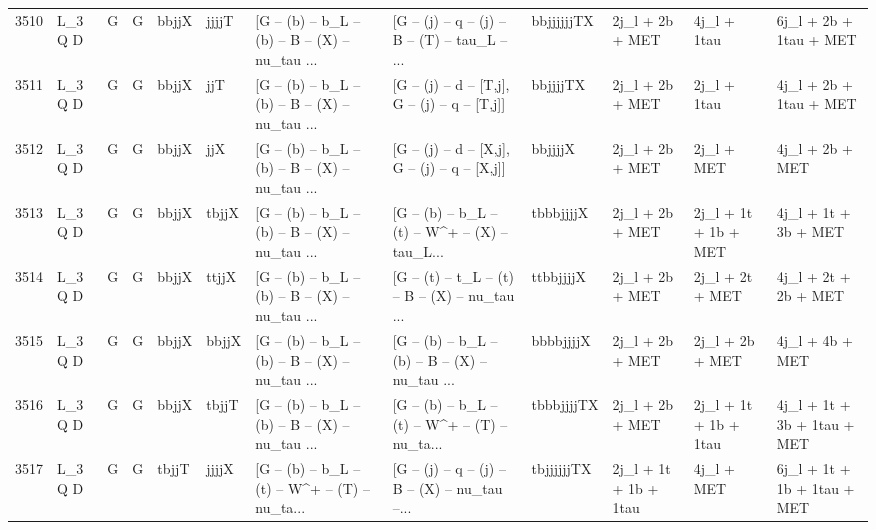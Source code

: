 \begin{tabular}{llllllllllll}
3510 &      L\_3 Q D &     G &     G &       bbjjX &       jjjjT &  [G -- (b) -- b\_L -- (b) -- B -- (X) -- nu\_tau ... &  [G -- (j) -- q -- (j) -- B -- (T) -- tau\_L -- ... &  bbjjjjjjTX &          2j\_l + 2b + MET &              4j\_l + 1tau &             6j\_l + 2b + 1tau + MET \\
3511 &      L\_3 Q D &     G &     G &       bbjjX &         jjT &  [G -- (b) -- b\_L -- (b) -- B -- (X) -- nu\_tau ... &   [G -- (j) -- d -- [T,j], G -- (j) -- q -- [T,j]] &    bbjjjjTX &          2j\_l + 2b + MET &              2j\_l + 1tau &             4j\_l + 2b + 1tau + MET \\
3512 &      L\_3 Q D &     G &     G &       bbjjX &         jjX &  [G -- (b) -- b\_L -- (b) -- B -- (X) -- nu\_tau ... &   [G -- (j) -- d -- [X,j], G -- (j) -- q -- [X,j]] &     bbjjjjX &          2j\_l + 2b + MET &               2j\_l + MET &                    4j\_l + 2b + MET \\
3513 &      L\_3 Q D &     G &     G &       bbjjX &       tbjjX &  [G -- (b) -- b\_L -- (b) -- B -- (X) -- nu\_tau ... &  [G -- (b) -- b\_L -- (t) -- W\textasciicircum + -- (X) -- tau\_L... &   tbbbjjjjX &          2j\_l + 2b + MET &     2j\_l + 1t + 1b + MET &               4j\_l + 1t + 3b + MET \\
3514 &      L\_3 Q D &     G &     G &       bbjjX &       ttjjX &  [G -- (b) -- b\_L -- (b) -- B -- (X) -- nu\_tau ... &  [G -- (t) -- t\_L -- (t) -- B -- (X) -- nu\_tau ... &   ttbbjjjjX &          2j\_l + 2b + MET &          2j\_l + 2t + MET &               4j\_l + 2t + 2b + MET \\
3515 &      L\_3 Q D &     G &     G &       bbjjX &       bbjjX &  [G -- (b) -- b\_L -- (b) -- B -- (X) -- nu\_tau ... &  [G -- (b) -- b\_L -- (b) -- B -- (X) -- nu\_tau ... &   bbbbjjjjX &          2j\_l + 2b + MET &          2j\_l + 2b + MET &                    4j\_l + 4b + MET \\
3516 &      L\_3 Q D &     G &     G &       bbjjX &       tbjjT &  [G -- (b) -- b\_L -- (b) -- B -- (X) -- nu\_tau ... &  [G -- (b) -- b\_L -- (t) -- W\textasciicircum + -- (T) -- nu\_ta... &  tbbbjjjjTX &          2j\_l + 2b + MET &    2j\_l + 1t + 1b + 1tau &        4j\_l + 1t + 3b + 1tau + MET \\
3517 &      L\_3 Q D &     G &     G &       tbjjT &       jjjjX &  [G -- (b) -- b\_L -- (t) -- W\textasciicircum + -- (T) -- nu\_ta... &  [G -- (j) -- q -- (j) -- B -- (X) -- nu\_tau --... &  tbjjjjjjTX &    2j\_l + 1t + 1b + 1tau &               4j\_l + MET &        6j\_l + 1t + 1b + 1tau + MET \\

\end{tabular}
